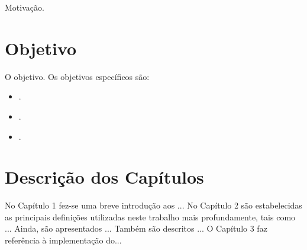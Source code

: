 \indent Motivação.


\section{Objetivo}

\indent O objetivo. Os objetivos específicos são:
\begin{itemize}
 \item .
 \item .
 \item .
\end{itemize}

\section{Descrição dos Capítulos}

\indent No Capítulo 1 fez-se uma breve introdução aos ... No Capítulo 2 são estabelecidas as principais definições utilizadas neste trabalho mais profundamente, tais 
como ... Ainda, são apresentados ... Também são descritos ... O Capítulo 3 faz referência à implementação do... 







